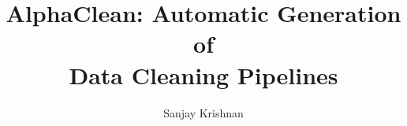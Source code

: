 \documentclass[10pt,sigconf]{acmart}
\begin{document}

\newcommand{\white}[1]{{\textcolor{white}{#1}\xspace}}
\newcommand{\blue}[1]{{\textcolor{blue}{{\bf #1}}\xspace}}
\newcommand{\orange}[1]{{\textcolor{orange}{{\bf #1}}\xspace}}
\newcommand{\pop}[1]{{\textcolor{pop}{{\textit{\textbf{#1}}}}\xspace}}
\newcommand{\red}[1]{\textcolor{red}{#1}}
\newcommand{\green}[1]{\textcolor{green}{#1}}
\newcommand{\gray}[1]{\textcolor{light-gray}{#1}}




\newcommand{\specialcell}[2][c]{%
  \begin{tabular}[#1]{@{}c@{}}#2\end{tabular}}

\def\ojoin{\setbox0=\hbox{$\bowtie$}%
  \rule[-.02ex]{.25em}{.4pt}\llap{\rule[\ht0]{.25em}{.4pt}}}
\def\leftouterjoin{\mathbin{\ojoin\mkern-5.8mu\bowtie}}
\def\rightouterjoin{\mathbin{\bowtie\mkern-5.8mu\ojoin}}
\def\fullouterjoin{\mathbin{\ojoin\mkern-5.8mu\bowtie\mkern-5.8mu\ojoin}}


\pagestyle{plain}

%

\title{AlphaClean: Automatic Generation of \\Data Cleaning Pipelines }


\author{Sanjay Krishnan}





\maketitle
\end{document}
